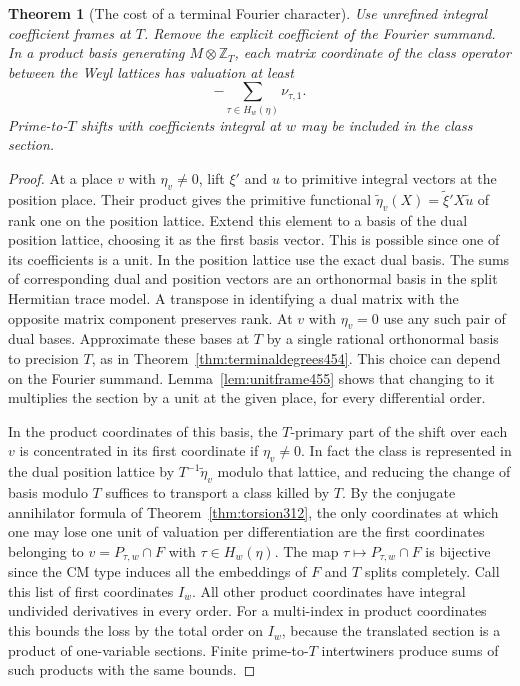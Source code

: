 \documentclass[a4paper,11pt]{article}
\newtheorem{theorem}[proposition]{Theorem}
\theoremstyle{definition}
\theoremstyle{remark}
\numberwithin{equation}{section}
\begin{document}
\begin{theorem}[The cost of a terminal Fourier character]\leavevmode
\label{thm:rankonecost455}
Use unrefined integral coefficient frames at \(T\). Remove
the explicit coefficient of the Fourier summand. In a product
basis generating \(M\otimes\mathbb Z_T\), each matrix
coordinate of the class operator between the Weyl lattices
has valuation at least
\[
                         -\sum_{\tau\in H_w(\eta)}\nu_{\tau,1}.
\]
Prime-to-\(T\) shifts with coefficients integral at \(w\)
may be included in the class section.
\end{theorem}
\begin{proof}
At a place \(v\) with \(\eta_v\ne0\), lift \(\xi'\) and \(u\)
to primitive integral vectors at the position place. Their
product gives the primitive functional
\(\widetilde\eta_v(X)=\widetilde\xi' X\widetilde u\) of rank
one on the position lattice. Extend this element to a basis of
the dual position lattice, choosing it as the first basis
vector. This is possible since one of its coefficients is a
unit. In the position lattice use the exact dual basis.
The sums of corresponding dual and position vectors are an
orthonormal basis in the split Hermitian trace model. A
transpose in identifying a dual matrix with the opposite
matrix component preserves rank. At \(v\) with \(\eta_v=0\)
use any such pair of dual bases. Approximate these bases at
\(T\) by a single rational orthonormal basis to precision
\(T\), as in Theorem~\ref{thm:terminaldegrees454}. This choice
can depend on the Fourier summand. Lemma~\ref{lem:unitframe455}
shows that changing to it multiplies the section by a unit
at the given place, for every differential order.

In the product coordinates of this basis, the \(T\)-primary
part of the shift over each \(v\) is concentrated in its
first coordinate if \(\eta_v\ne0\). In fact the class is
represented in the dual position lattice by
\(T^{-1}\widetilde\eta_v\) modulo that lattice, and reducing
the change of basis modulo \(T\) suffices to transport a
class killed by \(T\). By the conjugate annihilator formula
of Theorem~\ref{thm:torsion312}, the only coordinates at
which one may lose one unit of valuation per differentiation
are the first coordinates belonging to \(v=P_{\tau,w}\cap F\)
with \(\tau\in H_w(\eta)\). The map
\(\tau\mapsto P_{\tau,w}\cap F\) is bijective since the CM
type induces all the embeddings of \(F\) and \(T\) splits
completely. Call this list of first coordinates \(I_w\).
All other product coordinates have integral undivided
derivatives in every order. For a multi-index in product
coordinates this bounds the loss by the total order on
\(I_w\), because the translated section is a product of
one-variable sections. Finite prime-to-\(T\) intertwiners
produce sums of such products with the same bounds.


\end{proof}
\end{document}
